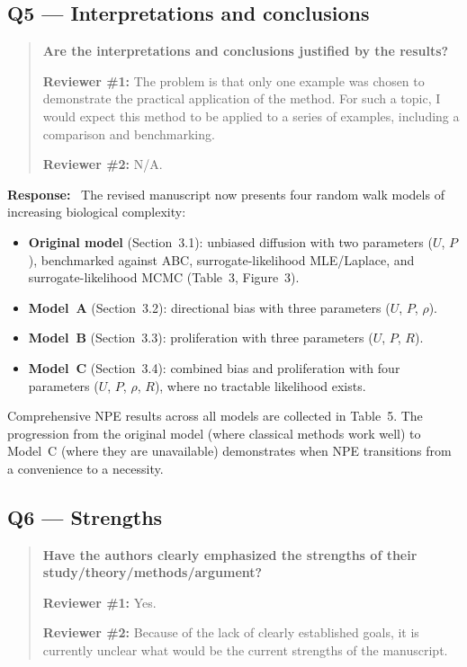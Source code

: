 \documentclass[11pt,a4paper]{article}
\newenvironment{reviewercomment}{%
  \begin{quote}\itshape\color{reviewerblue}%
}{%
  \end{quote}%
}
\newcommand{\response}{\textbf{Response:}~}
\begin{document}
\subsection*{Q5 --- Interpretations and conclusions}

\begin{reviewercomment}
\textbf{Are the interpretations and conclusions justified by the results?}

\textbf{Reviewer \#1:} The problem is that only one example was chosen to demonstrate the practical application of the method. For such a topic, I would expect this method to be applied to a series of examples, including a comparison and benchmarking.

\textbf{Reviewer \#2:} N/A.
\end{reviewercomment}

\response
The revised manuscript now presents four random walk models of increasing biological complexity:
\begin{itemize}[nosep]
  \item \textbf{Original model} (Section~3.1): unbiased diffusion with two parameters ($U$, $P$), benchmarked against ABC, surrogate-likelihood MLE/Laplace, and surrogate-likelihood MCMC (Table~3, Figure~3).
  \item \textbf{Model~A} (Section~3.2): directional bias with three parameters ($U$, $P$, $\rho$).
  \item \textbf{Model~B} (Section~3.3): proliferation with three parameters ($U$, $P$, $R$).
  \item \textbf{Model~C} (Section~3.4): combined bias and proliferation with four parameters ($U$, $P$, $\rho$, $R$), where no tractable likelihood exists.
\end{itemize}
Comprehensive NPE results across all models are collected in Table~5. The progression from the original model (where classical methods work well) to Model~C (where they are unavailable) demonstrates when NPE transitions from a convenience to a necessity.


\subsection*{Q6 --- Strengths}

\begin{reviewercomment}
\textbf{Have the authors clearly emphasized the strengths of their study/theory/methods/argument?}

\textbf{Reviewer \#1:} Yes.

\textbf{Reviewer \#2:} Because of the lack of clearly established goals, it is currently unclear what would be the current strengths of the manuscript.
\end{reviewercomment}
\end{document}
